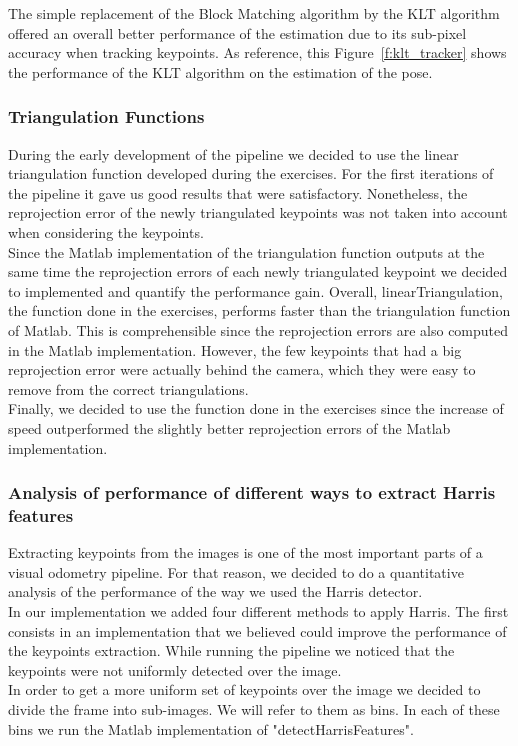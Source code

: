 The simple replacement of the Block Matching algorithm by the KLT algorithm offered an overall better performance of the estimation due to its sub-pixel accuracy when tracking keypoints. As reference, this Figure~\ref{f:klt_tracker} shows the performance of the KLT algorithm on the estimation of the pose.


\subsubsection{Triangulation Functions}
\label{sssec:triangulation}

During the early development of the pipeline we decided to use the linear triangulation function developed during the exercises.
For the first iterations of the pipeline it gave us good results that were satisfactory. Nonetheless, the reprojection error of the newly
triangulated keypoints was not taken into account when considering the keypoints. \\
Since the Matlab implementation of the triangulation function outputs at the same time the reprojection errors of each newly triangulated
keypoint we decided to implemented and quantify the performance gain.
Overall, linearTriangulation, the function done in the exercises, performs faster than the triangulation function of Matlab. This is
comprehensible since the reprojection errors are also computed in the Matlab implementation. However, the few keypoints that had a big reprojection error were actually behind the camera, which they were easy to remove from the correct triangulations. \\
Finally, we decided to use the function done in the exercises since the increase of speed outperformed the slightly better reprojection errors of the Matlab implementation.

\subsubsection{Analysis of performance of different ways to extract Harris features}

Extracting keypoints from the images is one of the most important parts of a visual odometry pipeline. For that reason, we
decided to do a quantitative analysis of the performance of the way we used the Harris detector. \\
In our implementation we added four different methods to apply Harris.
The first consists in an implementation that we believed could improve the performance of the keypoints extraction.
While running the pipeline we noticed that the keypoints were not uniformly detected over the image. \\
In order to get a more uniform set of keypoints over the image we decided to divide the frame into sub-images. We will refer to them
as bins. In each of these bins we run the Matlab implementation of "detectHarrisFeatures".

